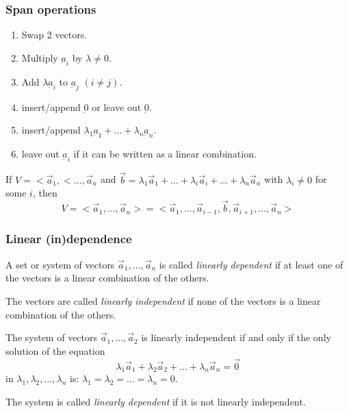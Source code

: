\subsubsection{Span operations}
\begin{enumerate}
    \item Swap 2 vectors.
    \item Multiply $\underbar{a}_i$ by $\lambda \ne 0$.
    \item Add $\lambda\underbar{a}_i$ to $\underbar{a}_j$ $(i \ne j)$.
    \item insert/append $\underbar{0}$ or leave out $\underbar{0}$.
    \item insert/append $\lambda_1\underbar{a}_1 + \dots + \lambda_n\underbar{a}_n$.
    \item leave out $\underbar{a}_i$ if it can be written as a linear combination.
\end{enumerate}

\begin{theorem}
    If $V = <\vec{a}_1,<\dots,\vec{a}_n$ and $ \vec{b} = \lambda_1\vec{a}_1+\dots+\lambda_i\vec{a}_i+\dots+\lambda_n\vec{a}_n $ with $\lambda_i\ne 0$ for some $i$, then
    $$ V = <\vec{a}_1,\dots,\vec{a}_n> = <\vec{a}_1,\dots,\vec{a}_{i-1},\vec{b},\vec{a}_{i+1},\dots,\vec{a}_n> $$
\end{theorem}


\subsubsection{Linear (in)dependence}
\begin{definition}
    A set or system of vectors $ \vec{a}_1,\dots,\vec{a}_n $ is called \emph{linearly dependent} if at least one of the vectors
    is a linear combination of the others. \par
    The vectors are called \emph{linearly independent} if none of the vectors is a linear combination of the others.
\end{definition}

\begin{definition}
    The system of vectors $ \vec{a}_1,\dots,\vec{a}_2 $ is linearly independent if and only if the only solution of the equation
    $$ \lambda_1\vec{a}_1 + \lambda_2\vec{a}_2 + \dots + \lambda_n\vec{a}_n = \vec{0} $$
    in $ \lambda_1,\lambda_2,\dots,\lambda_n $ is: $ \lambda_1=\lambda_2=\dots=\lambda_n=0 $. \par
    The system is called \emph{linearly dependent} if it is not linearly independent.
\end{definition}


